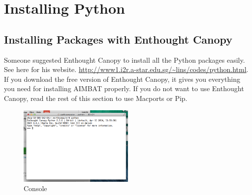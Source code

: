 \documentclass[letterpaper,10pt]{article}
\begin{document}


\section{Installing Python}


\subsection{Installing Packages with Enthought Canopy}

Someone suggested Enthought Canopy to install all the Python packages easily. See here for his website. \url{http://www1.i2r.a-star.edu.sg/~lins/codes/python.html}. If you download the free version of Enthought Canopy, it gives you everything you need for installing AIMBAT properly. If you do not want to use Enthought Canopy, read the rest of this section to use Macports or Pip. 

\begin{figure}[h!]
  \centering
  \includegraphics[width=0.5\textwidth]{images/enthought_console}
  \caption{Console}
  \label{fig:enthought_console}
\end{figure}

\end{document}
